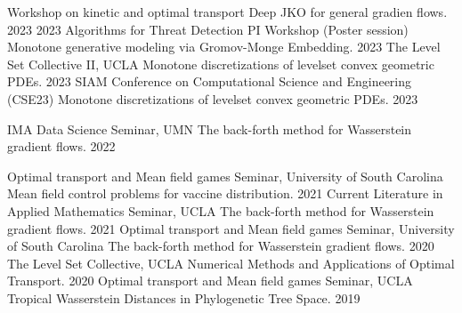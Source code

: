 


\begin{cvtalks}

\cvtalk
    {Workshop on kinetic and optimal transport} %
    {Deep JKO for general gradien flows.} %
    {2023} %
  \cvtalk
    {2023 Algorithms for Threat Detection PI Workshop (Poster session)} %
    {Monotone generative modeling via Gromov-Monge Embedding.} %
    {2023} %
  \cvtalk
    {The Level Set Collective II, UCLA} %
    {Monotone discretizations of levelset convex geometric PDEs.} %
    {2023} %
  \cvtalk
    {SIAM Conference on Computational Science and Engineering (CSE23)} %
    {Monotone discretizations of levelset convex geometric PDEs.} %
    {2023} %

  \cvtalk
    {IMA Data Science Seminar, UMN} %
    {The back-forth method for Wasserstein gradient flows.} %
    {2022} %
  
\end{cvtalks}

\vspace{-4mm}

\begin{cvtalks}


  \cvtalk
    {Optimal transport and Mean field games Seminar, University of South Carolina} %
    {Mean field control problems for vaccine distribution.} %
    {2021} %
  \cvtalk
    {Current Literature in Applied Mathematics Seminar, UCLA} %
    {The back-forth method for Wasserstein gradient flows.} %
    {2021} %
  \cvtalk
    {Optimal transport and Mean field games Seminar, University of South Carolina} %
    {The back-forth method for Wasserstein gradient flows.} %
    {2020} %
  \cvtalk
    {The Level Set Collective, UCLA} %
    {Numerical Methods and Applications of Optimal Transport.} %
    {2020} %
  \cvtalk
    {Optimal transport and Mean field games Seminar, UCLA} %
    {Tropical Wasserstein Distances in Phylogenetic Tree Space.} %
    {2019} %
    
\end{cvtalks}

